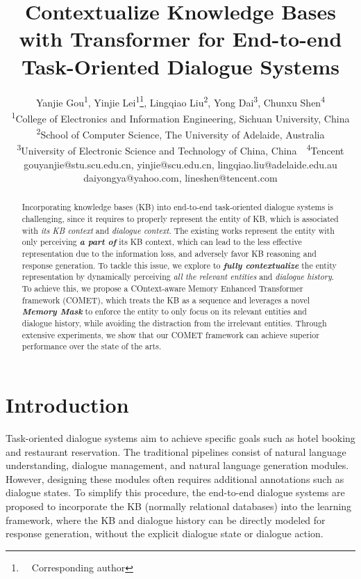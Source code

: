 \documentclass[11pt]{article}
\title{Contextualize Knowledge Bases with Transformer for End-to-end Task-Oriented Dialogue Systems}
\author{Yanjie Gou\textsuperscript{\rm 1}, 
Yinjie Lei\textsuperscript{\rm 1}\thanks{\ \  Corresponding author}, Lingqiao Liu\textsuperscript{\rm 2}, Yong Dai\textsuperscript{\rm 3}, Chunxu Shen\textsuperscript{\rm 4} \\
\textsuperscript{\rm 1}College of Electronics and Information Engineering, Sichuan University, China \\
\textsuperscript{\rm 2}School of Computer Science, The University of Adelaide, Australia \\
\textsuperscript{\rm 3}University of Electronic Science and Technology of China, China\  \  \textsuperscript{\rm 4}Tencent \\
gouyanjie@stu.scu.edu.cn, yinjie@scu.edu.cn, lingqiao.liu@adelaide.edu.au\\ daiyongya@yahoo.com, lineshen@tencent.com}
\begin{document}
\maketitle
\begin{abstract}
Incorporating knowledge bases (KB) into end-to-end task-oriented dialogue systems is challenging, since it requires to properly represent the entity of KB, which is associated with \textit{its KB context} and \textit{dialogue context}.
The existing works represent the entity with only perceiving \textit{\textbf{a part of}} its KB context, which can lead to the less effective representation due to the information loss, and adversely favor KB reasoning and response generation.
To tackle this issue, we explore to \textit{\textbf{fully contextualize}} the entity representation by dynamically perceiving \textit{all the relevant entities} and \textit{dialogue history}.
To achieve this, we propose a COntext-aware Memory Enhanced Transformer framework (COMET), 
which treats the KB as a sequence and leverages a novel \textit{\textbf{Memory Mask}} to enforce the entity to only focus on its relevant entities and dialogue history, while avoiding the distraction from the irrelevant entities.
Through extensive experiments, we show that our COMET framework can achieve superior performance over the state of the arts.
\end{abstract}



\section{Introduction}



Task-oriented dialogue systems aim to achieve specific goals such as hotel booking and restaurant reservation. The traditional pipelines \cite{young-2017-pomdp,wen-etal-2017-network} consist of natural language understanding, dialogue management, and natural language generation modules. However, designing these modules often requires additional annotations such as dialogue states. To simplify this procedure, the end-to-end dialogue systems \cite{eric-manning-2017-copy} are proposed to incorporate the KB (normally relational databases) into the learning framework, where the KB and dialogue history can be directly modeled for response generation, without the explicit dialogue state or dialogue action. 
\end{document}
